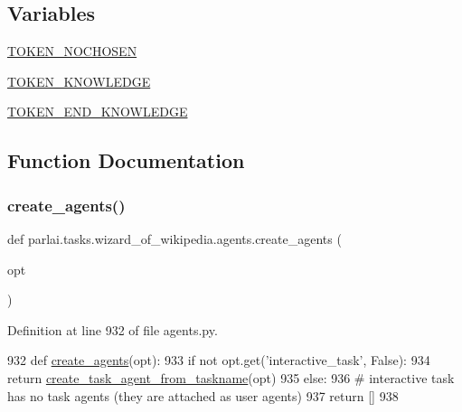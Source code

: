 \subsection*{Variables}
\begin{DoxyCompactItemize}
\item 
\hyperlink{namespaceparlai_1_1tasks_1_1wizard__of__wikipedia_1_1agents_a09d5b8be32016dd453d5693a3783d5ca}{T\+O\+K\+E\+N\+\_\+\+N\+O\+C\+H\+O\+S\+EN}
\item 
\hyperlink{namespaceparlai_1_1tasks_1_1wizard__of__wikipedia_1_1agents_a8027e49c1ff6e792fde5385a5146e40a}{T\+O\+K\+E\+N\+\_\+\+K\+N\+O\+W\+L\+E\+D\+GE}
\item 
\hyperlink{namespaceparlai_1_1tasks_1_1wizard__of__wikipedia_1_1agents_a15d544ca026e73b33e93827df9d2f97f}{T\+O\+K\+E\+N\+\_\+\+E\+N\+D\+\_\+\+K\+N\+O\+W\+L\+E\+D\+GE}
\end{DoxyCompactItemize}


\subsection{Function Documentation}
\mbox{\label{namespaceparlai_1_1tasks_1_1wizard__of__wikipedia_1_1agents_a3fb02e79313f0dbce37b5120cc9add1c}} 
\subsubsection{\texorpdfstring{create\+\_\+agents()}{create\_agents()}}
{\footnotesize\ttfamily def parlai.\+tasks.\+wizard\+\_\+of\+\_\+wikipedia.\+agents.\+create\+\_\+agents (\begin{DoxyParamCaption}\item[{}]{opt }\end{DoxyParamCaption})}



Definition at line 932 of file agents.\+py.


\begin{DoxyCode}
932 \textcolor{keyword}{def }\hyperlink{namespaceparlai_1_1tasks_1_1wizard__of__wikipedia_1_1agents_a3fb02e79313f0dbce37b5120cc9add1c}{create\_agents}(opt):
933     \textcolor{keywordflow}{if} \textcolor{keywordflow}{not} opt.get(\textcolor{stringliteral}{'interactive\_task'}, \textcolor{keyword}{False}):
934         \textcolor{keywordflow}{return} \hyperlink{namespaceparlai_1_1core_1_1agents_a76269fb567532a8fb7f29edcc20a6e47}{create\_task\_agent\_from\_taskname}(opt)
935     \textcolor{keywordflow}{else}:
936         \textcolor{comment}{# interactive task has no task agents (they are attached as user agents)}
937         \textcolor{keywordflow}{return} []
938 \end{DoxyCode}


